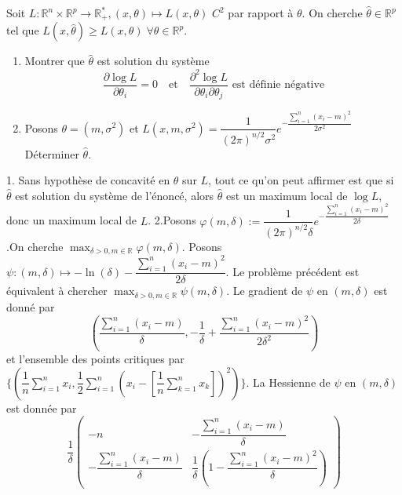 \documentclass{fancybook}
\begin{document}
\begin{exercice}
Soit $L:\mathbb R^n \times \mathbb R^p \to \mathbb R_+^*, (x,\theta)\mapsto L(x,\theta)$ $C^2$ par rapport à $\theta$.\newline
On cherche $\hat \theta\in \mathbb R^p$ tel que $L(x,\hat \theta) \geq L(x,\theta) \; \forall \theta \in \mathbb R^p$.
\begin{enumerate}
\item Montrer que $\hat \theta$ est solution du système $$\dfrac{\partial \log L}{\partial \theta_i}=0 \quad \text{et} \quad \dfrac{\partial^2 \log L}{\partial \theta_i \partial \theta_j} \text{ est définie négative} $$
\item Posons $\theta = (m,\sigma^2)$ et $L(x,m,\sigma^2)=\dfrac{1}{(2\pi)^{n/2}\sigma^2}e^{-\dfrac{\sum_{i=1}^n (x_i-m)^2}{2\sigma^2}}$\newline
Déterminer $\hat \theta$.
\end{enumerate}
\end{exercice}
1. Sans hypothèse de concavité en $\theta$ sur $L$, tout ce qu'on peut affirmer est que si $\hat \theta$ est solution du système de l'énoncé, alors $\hat \theta$ est un maximum local de $\log L$, donc un maximum local de $L$.\newline
\newline
2.Posons $\varphi(m,\delta):=\dfrac{1}{(2\pi)^{n/2}\delta}e^{-\dfrac{\sum_{i=1}^n (x_i-m)^2}{2\delta}}$.\newline On cherche $\displaystyle \max_{\delta >0, m \in \mathbb R} \varphi(m,\delta)$. \newline
Posons $\psi:(m,\delta)\mapsto -\ln(\delta) - \dfrac{\sum_{i=1}^n(x_i-m)^2}{2\delta}$. Le problème précédent est équivalent à chercher $\max_{\delta >0, m \in \mathbb R} \psi(m,\delta)$.\newline
Le gradient de $\psi$ en $(m,\delta)$ est donné par $$\left(\dfrac{\sum_{i=1}^n (x_i-m)}{\delta}, -\dfrac{1}{\delta} + \dfrac{\sum_{i=1}^n (x_i-m)^2}{2\delta^2}  \right)$$ et l'ensemble des points critiques par $\{(\dfrac{1}{n}\sum_{i=1}^n x_i, \dfrac{1}{2}\sum_{i=1}^n \left(x_i - \left[\dfrac{1}{n}\sum_{k=1}^n x_k \right]\right)^2)\}$. \newline
La Hessienne de $\psi$ en $(m,\delta)$ est donnée par $$\dfrac{1}{\delta}\begin{pmatrix}
-n & -\dfrac{\sum_{i=1}^n (x_i-m)}{\delta} \\
-\dfrac{\sum_{i=1}^n (x_i-m)}{\delta} & \dfrac{1}{\delta} \left(1-\dfrac{\sum_{i=1}^n (x_i-m)^2}{\delta} \right)
\end{pmatrix}$$
\end{document}

